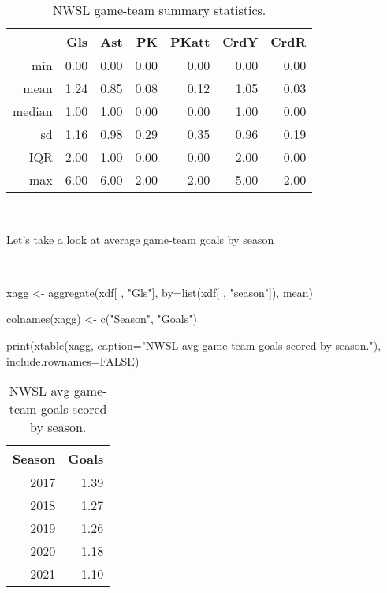 \documentclass[
]{article}
\newenvironment{Shaded}{\begin{snugshade}}{\end{snugshade}}
\newcommand{\AttributeTok}[1]{\textcolor[rgb]{0.77,0.63,0.00}{#1}}
\newcommand{\ConstantTok}[1]{\textcolor[rgb]{0.00,0.00,0.00}{#1}}
\newcommand{\FunctionTok}[1]{\textcolor[rgb]{0.00,0.00,0.00}{#1}}
\newcommand{\NormalTok}[1]{#1}
\newcommand{\OtherTok}[1]{\textcolor[rgb]{0.56,0.35,0.01}{#1}}
\newcommand{\StringTok}[1]{\textcolor[rgb]{0.31,0.60,0.02}{#1}}
\begin{document}
\begin{table}[ht]
\centering
\begin{tabular}{rrrrrrr}
  \hline
 & Gls & Ast & PK & PKatt & CrdY & CrdR \\ 
  \hline
min & 0.00 & 0.00 & 0.00 & 0.00 & 0.00 & 0.00 \\ 
  mean & 1.24 & 0.85 & 0.08 & 0.12 & 1.05 & 0.03 \\ 
  median & 1.00 & 1.00 & 0.00 & 0.00 & 1.00 & 0.00 \\ 
  sd & 1.16 & 0.98 & 0.29 & 0.35 & 0.96 & 0.19 \\ 
  IQR & 2.00 & 1.00 & 0.00 & 0.00 & 2.00 & 0.00 \\ 
  max & 6.00 & 6.00 & 2.00 & 2.00 & 5.00 & 2.00 \\ 
   \hline
\end{tabular}
\caption{NWSL game-team summary statistics.} 
\end{table}

~~

Let's take a look at average game-team goals by season

~~

\begin{Shaded}
\begin{Highlighting}[]
\NormalTok{xagg }\OtherTok{\textless{}{-}} \FunctionTok{aggregate}\NormalTok{(xdf[ , }\StringTok{"Gls"}\NormalTok{], }\AttributeTok{by=}\FunctionTok{list}\NormalTok{(xdf[ , }\StringTok{"season"}\NormalTok{]), mean)}

\FunctionTok{colnames}\NormalTok{(xagg) }\OtherTok{\textless{}{-}} \FunctionTok{c}\NormalTok{(}\StringTok{"Season"}\NormalTok{, }\StringTok{"Goals"}\NormalTok{)}

\FunctionTok{print}\NormalTok{(}\FunctionTok{xtable}\NormalTok{(xagg, }\AttributeTok{caption=}\StringTok{"NWSL avg game{-}team goals scored by season."}\NormalTok{), }\AttributeTok{include.rownames=}\ConstantTok{FALSE}\NormalTok{)}
\end{Highlighting}
\end{Shaded}

\begin{table}[ht]
\centering
\begin{tabular}{rr}
  \hline
Season & Goals \\ 
  \hline
2017 & 1.39 \\ 
  2018 & 1.27 \\ 
  2019 & 1.26 \\ 
  2020 & 1.18 \\ 
  2021 & 1.10 \\ 
   \hline
\end{tabular}
\caption{NWSL avg game-team goals scored by season.} 
\end{table}
\end{document}
